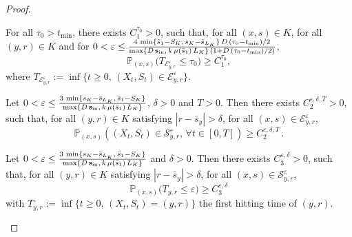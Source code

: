 \documentclass[AHL,Unicode,longabstracts,published]{cedram}
\newcommand{\PP}{\mathbb{P}}
\newcommand{\clE}{\mathcal{E}}
\newcommand{\clS}{\mathcal{S}}
\newcommand{\Sin}{{\mathbf s}_{\textrm{\tiny\rm in}}}
\newcommand{\SminK}{s_K}
\newcommand{\SmaxK}{S_K}
\newcommand{\barmu}{\mu(\bar s_1)}
\newcommand{\lmax}{{L_K}}
\newcommand{\1}{\mathbf{1}}
\let\oldforall\forall
\renewcommand*{\forall}{\mathrel{\oldforall}}
\begin{document}
\begin{proof}
\begin{lemm}\label{de.partout.a.presque.partout}
For all $\tau_0>t_{\min}$, there exists $C_1^{\tau_0}>0$, such that, for all $(x,s)\in K$, for all $(y,r)\in K$ and for $0<\varepsilon\leq\frac{4\,\min\{\bar s_1-\SmaxK,\, \SminK-\bar s_{\lmax}\}\,D\,(\tau_0-t_{\min})/2}{\max\{D\,\Sin,\, k\,\barmu\,\lmax\}\,(1+D\,(\tau_0-t_{\min})/2)}$,
\[
\PP_{(x,s)}\big(T_{\clE_{y,r}^\varepsilon}
\leq \tau_0\big)\geq C_1^{\tau_0},
\]
where $T_{\clE_{y,r}^\varepsilon}:=\inf\{t\geq 0,\, (X_t,S_t)\in \clE_{y,r}^\varepsilon\}$.
\end{lemm}




\begin{lemm}\label{lemma.stay.in.S}
Let $0<\varepsilon\leq \frac{3\,\min\{\SminK-\bar s_{\lmax},\, \bar s_1-\SmaxK\}}{\max\{D\,\Sin,\, k\,\barmu\,\lmax\}}$, $\delta>0$ and $T>0$. Then there exists $C^{\varepsilon,\delta,T}_2>0$, such that, for all $(y,r)\in K$ satisfying $|r-\bar s_y|>\delta$, for all $(x,s) \in \clE_{y,r}^\varepsilon$,
\[
\PP_{(x,s)}
\left((X_t,S_t) \in \clS_{y,r}^\varepsilon, \,
\forall t\in[0,T]\right)\geq C^{\varepsilon,\delta,T}_2\,.
\]
\end{lemm}




\begin{lemm}\label{lemma.Tys.depuis.S}
Let $0<\varepsilon\leq \frac{3\,\min\{\SminK-\bar s_{\lmax},\, \bar s_1-\SmaxK\}}{\max\{D\,\Sin,\, k\,\barmu\,\lmax\}}$ and $\delta>0$. Then there exists $C^{\varepsilon,\delta}_3>0$, such that, for all $(y,r)\in K$ satisfying $|r-\bar s_y|>\delta$, for all $(x,s) \in \clS_{y,r}^\varepsilon$,
\[
\PP_{(x,s)}
\Big(T_{y,r} \leq \varepsilon \Big)\geq C^{\varepsilon,\delta}_3
\]
with $T_{y,r}:=\inf\{t\geq 0, \, (X_t,S_t)=(y,r)\}$ the first hitting time of $(y,r)$.
\end{lemm}




\end{proof}
\end{document}
